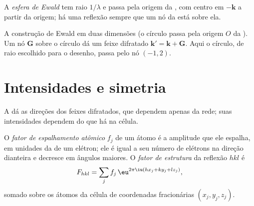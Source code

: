 \begin{definition}\label{def:b3:x-ray-diffraction:ewald}
A \emph{esfera de Ewald} tem raio $1/\lambda$ e passa pela
origem da , com centro em $-\mathbf k$ a partir da origem; há uma
reflexão sempre que um nó da  está sobre ela.
\end{definition}

\begin{omfigure}

{\small A construção de Ewald em duas dimensões (o círculo passa pela origem
$O$ da ). Um nó $\mathbf G$ sobre o círculo dá um feixe
difratado $\mathbf k' = \mathbf k + \mathbf G$. Aqui o círculo, de raio escolhido para o
desenho, passa pelo nó $(-1, 2)$.}
\end{omfigure}

\section{Intensidades e simetria}

A  dá as direções dos feixes difratados, que dependem apenas da
rede; suas intensidades dependem do que há na célula.

\begin{definition}\label{def:b3:x-ray-diffraction:structure-factor}
O \emph{fator de espalhamento atômico} $f_j$ de um
átomo é a amplitude que ele espalha, em unidades da de um elétron; ele é igual
a seu número de elétrons na direção dianteira e decresce em ângulos maiores. O
\emph{fator de estrutura} da reflexão $hkl$ é
\[
F_{hkl} = \sum_jf_j\,\eu^{2\pi\iu(hx_j + ky_j + lz_j)},
\]
somado sobre os átomos da célula de coordenadas fracionárias $(x_j, y_j, z_j)$.
\end{definition}

